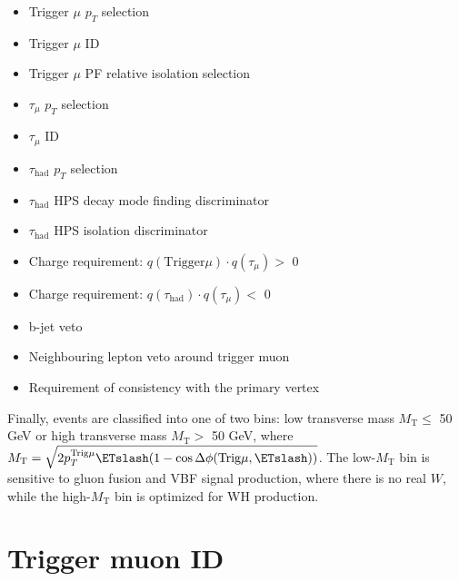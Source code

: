 \begin{itemize}
	\item Trigger $\mu$ $p_T$ selection
	\item Trigger $\mu$ ID
	\item Trigger $\mu$ PF relative isolation selection
	\item $\tau_{\mu}$ $p_T$ selection
	\item $\tau_{\mu}$ ID
	\item $\tau_{\text{had}}$ $p_T$ selection
	\item $\tau_{\text{had}}$ HPS decay mode finding discriminator
	\item $\tau_{\text{had}}$ HPS isolation discriminator
	\item Charge requirement: $q(\text{Trigger} \mu) \cdot q(\tau_{\mu}) >$ 0
	\item Charge requirement: $q(\tau_{\text{had}}) \cdot q(\tau_{\mu}) <$ 0
        \item b-jet veto
        \item Neighbouring lepton veto around trigger muon
	\item Requirement of consistency with the primary vertex
\end{itemize}

Finally, events are classified into one of two bins: low transverse mass $M_{\text{T}} \le$ 50 GeV or high transverse mass $M_{\text{T}} >$ 50 GeV, where $M_{\text{T}} = \sqrt{2p_{T}^{\text{Trig}\mu}\ETslash(1 - \cos{\Delta\phi(\text{Trig}\mu, \ETslash)})}$.  The low-$M_{\text{T}}$ bin is sensitive to gluon fusion and VBF signal production, where there is no real $W$, while the high-$M_{\text{T}}$ bin is optimized for WH production.

\section{Trigger muon ID\label{sec:evtsel-triggermu}}

